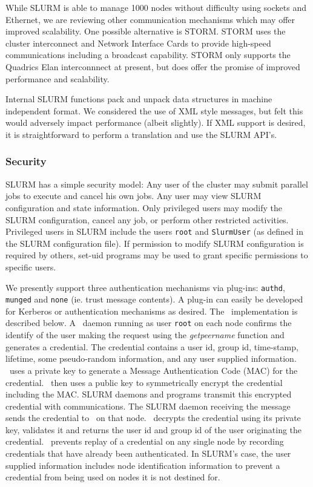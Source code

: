 While SLURM is able to manage 1000 nodes without difficulty using 
sockets and Ethernet, we are reviewing other communication 
mechanisms which may offer improved scalability. 
One possible alternative is STORM\cite{STORM2001}. 
STORM uses the cluster interconnect and Network Interface Cards to 
provide high-speed communications including a broadcast capability. 
STORM only supports the Quadrics Elan interconnnect at present, 
but does offer the promise of improved performance and scalability. 

Internal SLURM functions pack and unpack data structures in machine 
independent format. We considered the use of XML style messages, 
but felt this would adversely impact performance (albeit slightly). 
If XML support is desired, it is straightforward to perform a translation 
and use the SLURM API's.

\subsubsection{Security}

SLURM has a simple security model: 
Any user of the cluster may submit parallel jobs to execute and cancel
his own jobs.  Any user may view SLURM configuration and state
information.  
Only privileged users may modify the SLURM configuration,
cancel any job, or perform other restricted activities.  
Privileged users in SLURM include the users {\tt root} 
and {\tt SlurmUser} (as defined in the SLURM configuration file). 
If permission to modify SLURM configuration is 
required by others, set-uid programs may be used to grant specific
permissions to specific users.

We presently support three authentication mechanisms via plug-ins: 
{\tt authd}\cite{Authd2002}, {\tt munged} and {\tt none} 
(ie. trust message contents). 
A plug-in can easily be developed for Kerberos or authentication 
mechanisms as desired.
The \munged\ implementation is described below.
A \munged\ daemon running as user {\tt root} on each node confirms the 
identify of the user making the request using the {\em getpeername} 
function and generates a credential. 
The credential contains a user id, 
group id, time-stamp, lifetime, some pseudo-random information, and 
any user supplied information. \munged\ uses a private key to 
generate a Message Authentication Code (MAC) for the credential.
\munged\ then uses a public key to symmetrically encrypt 
the credential including the MAC. 
SLURM daemons and programs transmit this encrypted 
credential with communications. The SLURM daemon receiving the message 
sends the credential to \munged\ on that node. 
\munged\ decrypts the credential using its private key, validates it 
and returns the user id and group id of the user originating the 
credential.
\munged\ prevents replay of a credential on any single node 
by recording credentials that have already been authenticated.
In SLURM's case, the user supplied information includes node 
identification information to prevent a credential from being 
used on nodes it is not destined for.

